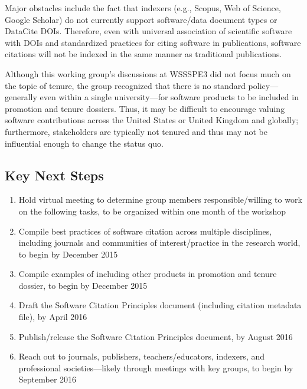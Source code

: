 Major obstacles include the fact that indexers (e.g., Scopus, Web of Science,  Google Scholar) do not currently support software/data document types or  DataCite DOIs.
Therefore, even with universal association of scientific software with DOIs and standardized practices for citing software in publications, software citations will not be indexed in the same manner as traditional publications.

Although this working group's discussions at WSSSPE3 did not focus much on the topic of tenure, the group recognized that there is no standard policy---generally even within a single university---for software products to be included in promotion and tenure dossiers.
Thus, it may be difficult to encourage valuing software contributions across the United States or United Kingdom and globally; furthermore, stakeholders are typically not tenured and thus may not be influential enough to change the status quo.

\subsection{Key Next Steps}
\label{SC:next-steps}

\begin{enumerate}
\item Hold virtual meeting to determine group members responsible\slash willing to work on the following tasks, to be organized within one month of the workshop
\item Compile best practices of software citation across multiple disciplines, including journals and communities of interest\slash practice in the research world, to begin by December 2015
\item Compile examples of including other products in promotion and tenure dossier, to begin by December 2015
\item Draft the Software Citation Principles document (including citation metadata file), by April 2016
\item Publish\slash release the Software Citation Principles document, by August 2016
\item Reach out to journals, publishers, teachers\slash educators, indexers, and professional societies---likely through meetings with key groups, to begin by September 2016

\end{enumerate}

